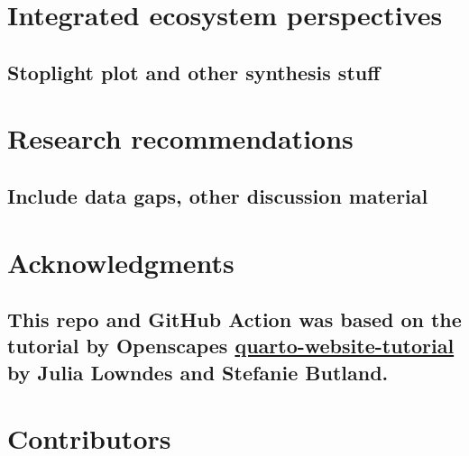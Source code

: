 \documentclass[
  letterpaper,
  oneside,
  open=any]{scrbook}
\begin{document}

\chapter{Integrated ecosystem
perspectives}\label{integrated-ecosystem-perspectives}

\section{Stoplight plot and other synthesis
stuff}\label{stoplight-plot-and-other-synthesis-stuff}


\chapter{Research recommendations}\label{research-recommendations}

\section{Include data gaps, other discussion
material}\label{include-data-gaps-other-discussion-material}


\chapter{Acknowledgments}\label{acknowledgments}

\section{\texorpdfstring{This repo and GitHub Action was based on the
tutorial by Openscapes
\href{https://github.com/Openscapes/quarto-website-tutorial}{quarto-website-tutorial}
by Julia Lowndes and Stefanie
Butland.}{This repo and GitHub Action was based on the tutorial by Openscapes quarto-website-tutorial by Julia Lowndes and Stefanie Butland.}}\label{this-repo-and-github-action-was-based-on-the-tutorial-by-openscapes-quarto-website-tutorial-by-julia-lowndes-and-stefanie-butland.}


\chapter{Contributors}\label{contributors}
\end{document}
